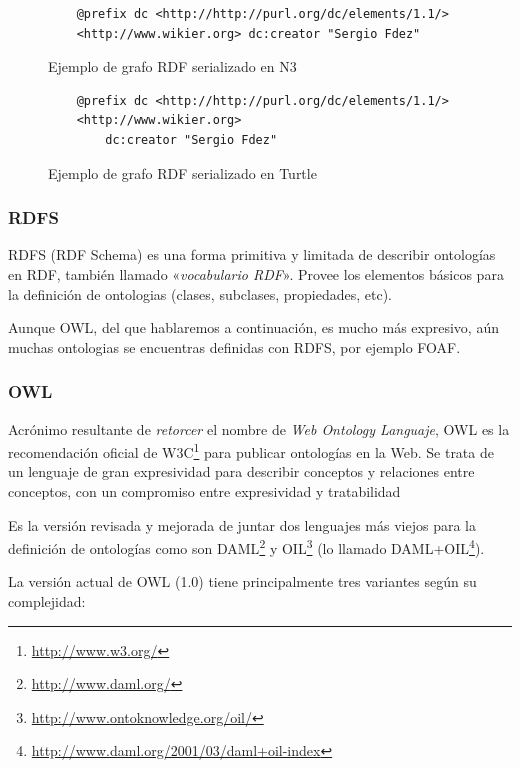\begin{figure}[tp]
\begin{verbatim}
	@prefix dc <http://http://purl.org/dc/elements/1.1/>
	<http://www.wikier.org> dc:creator "Sergio Fdez"
\end{verbatim}
	\caption{Ejemplo de grafo RDF serializado en N3}
	\label{fig:ejemplo.rdfn3}
\end{figure}

\begin{figure}[tp]
\begin{verbatim}
	@prefix dc <http://http://purl.org/dc/elements/1.1/>
	<http://www.wikier.org> 
		dc:creator "Sergio Fdez"
\end{verbatim}
	\caption{Ejemplo de grafo RDF serializado en Turtle}
	\label{fig:ejemplo.rdfturtle}
\end{figure}

\subsubsection{RDFS}

RDFS\cite{RDFS} (RDF Schema) es una forma primitiva y limitada de describir 
ontologías en RDF, también llamado «\emph{vocabulario RDF}». Provee los elementos
básicos para la definición de ontologias (clases, subclases, propiedades, etc).

Aunque OWL, del que hablaremos a continuación, es mucho más expresivo, aún muchas
ontologias se encuentras definidas con RDFS, por ejemplo FOAF.

\subsubsection{OWL}

Acrónimo resultante de \emph{retorcer} el nombre de 
\emph{Web Ontology Languaje}, OWL\cite{OWL} es la recomendación 
oficial de W3C\footnote{\url{http://www.w3.org/}} para publicar ontologías en 
la Web. Se trata de un lenguaje de gran expresividad para describir conceptos 
y relaciones entre conceptos, con un compromiso entre expresividad y tratabilidad

Es la versión revisada y mejorada de juntar dos lenguajes más viejos para la 
definición de ontologías como son DAML\footnote{\url{http://www.daml.org/}} y 
OIL\footnote{\url{http://www.ontoknowledge.org/oil/}} (lo llamado
DAML+OIL\footnote{\url{http://www.daml.org/2001/03/daml+oil-index}}).

La versión actual de OWL (1.0) tiene principalmente tres variantes según su
complejidad:


